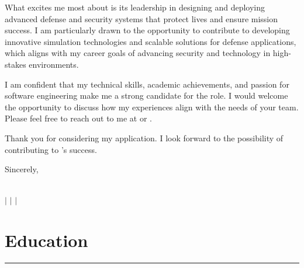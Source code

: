 \documentclass[10pt]{article}
\begin{document}
What excites me most about \company \space is its leadership in designing and deploying advanced defense and security systems that protect lives and ensure mission success. I am particularly drawn to the opportunity to contribute to developing innovative simulation technologies and scalable solutions for defense applications, which aligns with my career goals of advancing security and technology in high-stakes environments.

I am confident that my technical skills, academic achievements, and passion for software engineering make me a strong candidate for the \position \space role. I would welcome the opportunity to discuss how my experiences align with the needs of your team. Please feel free to reach out to me at \href{tel:+15149445977}{\phone} \space or \href{mailto:massimo02caruso@gmail.com}{\email}.

\vspace{1.5em}
Thank you for considering my application. I look forward to the possibility of contributing to \company's success.

\vspace{2em}
Sincerely, \\
\fullname

\newpage

\begin{center}
    {\Huge \textbf{\fullname}} \\
    \vspace{1mm}
    {\small 
    \faPhone \hspace{0mm} \href{tel:+15149445977}{\phone} $\vert$ 
    \faEnvelope \hspace{0mm} \href{mailto:massimo02caruso@gmail.com}{\email} $\vert$ 
    \faLinkedin \hspace{0mm} \href{https://linkedin.com/in/massimocaruso}{\linkedin} $\vert$ 
    \faGithub \hspace{0mm} \href{https://github.com/Extinctable}{\github}
    }
\end{center}

\vspace{-8mm}

\section*{Education}
\vspace{-2mm}
\hrule
\vspace{0mm}
\end{document}
